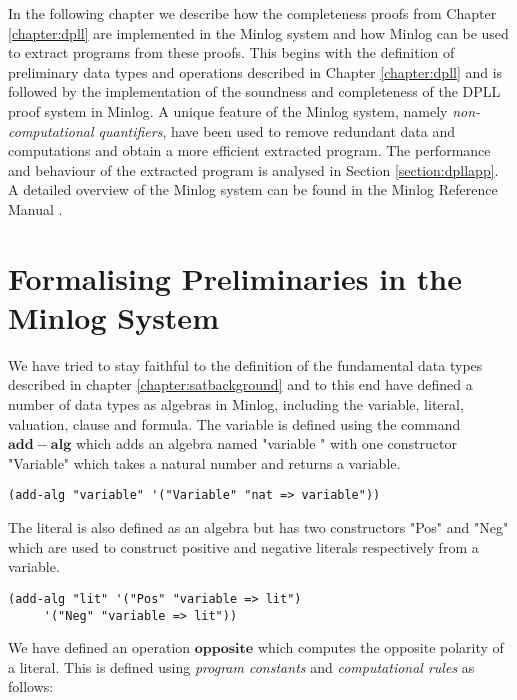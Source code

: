 
\label{chapter:dpllminlog}
In the following chapter we describe how the completeness proofs from Chapter \ref{chapter:dpll} are implemented in the Minlog system and how Minlog can be used to extract programs from these proofs.  This begins with the definition of preliminary data types and operations described in Chapter \ref{chapter:dpll} and is followed by the implementation of the soundness and completeness of the DPLL proof system in Minlog. A unique feature of the Minlog system, namely \emph{non-computational quantifiers}, have been used to remove redundant data and computations and obtain a more efficient extracted program. The performance and behaviour of the extracted program is analysed in Section \ref{section:dpllapp}. A detailed overview of the Minlog system can be found in the Minlog Reference Manual \cite{MinlogRef}.

\section{Formalising Preliminaries in the Minlog System}\label{sect:minlogprelim}
We have tried to stay faithful to the definition of the fundamental data types described in chapter \ref{chapter:satbackground} and to this end have defined a number of data types as algebras in Minlog, including the variable, literal, valuation, clause and formula. The variable is defined using the command $\mathbf{add-alg}$ which adds an algebra named "variable " with one constructor "Variable" which takes a natural number and returns a variable.
\begin{lstlisting}[caption = "Definition of a variable in Minlog"]
(add-alg "variable" '("Variable" "nat => variable"))
\end{lstlisting}
The literal is also defined as an algebra but has two constructors "Pos" and "Neg" which are used to construct positive and negative literals respectively from a variable.
\begin{lstlisting}[caption = "Definition of a literal in Minlog"]
(add-alg "lit" '("Pos" "variable => lit")
     '("Neg" "variable => lit"))
\end{lstlisting}

We have defined an operation $\mathbf{opposite}$ which computes the opposite polarity of a literal. This is defined using \emph{program constants} and \emph{computational rules} as follows:

